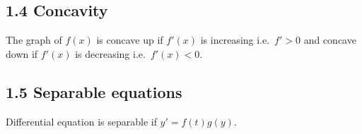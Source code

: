 \documentclass[
  11pt,
]{article}
\begin{document}
\subsection{1.4 Concavity}\label{concavity}

The graph of \(f(x)\) is concave up if \(f'(x)\) is increasing
i.e.~\(f'>0\) and concave down if \(f'(x)\) is decreasing
i.e.~\(f'(x)<0\).

\clearpage

\begin{figure}
\end{figure}

\subsection{1.5 Separable equations}\label{separable-equations}

Differential equation is separable if \(y'=f(t)g(y)\).\\
\end{document}
